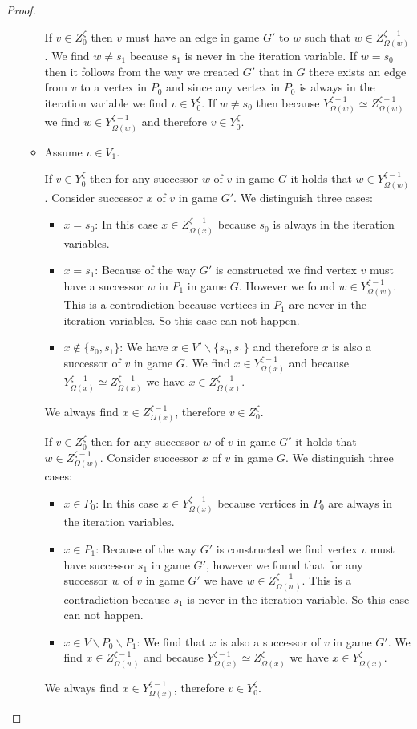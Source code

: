 \begin{theorem}
\begin{proof}
\begin{itemize}
\begin{itemize}
				If $v \in Z_0^{\zeta}$ then $v$ must have an edge in game $G'$ to $w$ such that $w\in Z^{\zeta-1}_{\Omega(w)}$. We find $w \neq s_1$ because $s_1$ is never in the iteration variable. If $w = s_0$ then it follows from the way we created $G'$ that in $G$ there exists an edge from $v$ to a vertex in $P_0$ and since any vertex in $P_0$ is always in the iteration variable we find $v \in Y_0^{\zeta}$. If $w \neq s_0$ then because $Y^{\zeta-1}_{\Omega(w)} \simeq Z^{\zeta-1}_{\Omega(w)}$ we find $w \in Y^{\zeta-1}_{\Omega(w)}$ and therefore $v \in Y_0^{\zeta}$.
				\item Assume $v \in V_1$.
				
				If $v \in Y_0^{\zeta}$ then for any successor $w$ of $v$ in game $G$ it holds that $w \in Y^{\zeta-1}_{\Omega(w)}$. Consider successor $x$ of $v$ in game $G'$. We distinguish three cases:
				\begin{itemize}
					\item $x = s_0$: In this case $x \in Z^{\zeta-1}_{\Omega(x)}$ because $s_0$ is always in the iteration variables.
					\item $x = s_1$: Because of the way $G'$ is constructed we find vertex $v$ must have a successor $w$ in $P_1$ in game $G$. However we found $w \in Y^{\zeta-1}_{\Omega(w)}$. This is a contradiction because vertices in $P_1$ are never in the iteration variables. So this case can not happen.
					\item $x \notin \{s_0,s_1\}$: We have $x \in V'\backslash \{s_0,s_1\}$ and therefore $x$ is also a successor of $v$ in game $G$. We find $x \in Y^{\zeta-1}_{\Omega(x)}$ and because $Y^{\zeta-1}_{\Omega(x)} \simeq Z^{\zeta-1}_{\Omega(x)}$ we have $x \in Z^{\zeta-1}_{\Omega(x)}$.
				\end{itemize}
				We always find  $x \in Z^{\zeta-1}_{\Omega(x)}$, therefore $v \in Z_0^{\zeta}$.
				
				If $v \in Z_0^{\zeta}$ then for any successor $w$ of $v$ in game $G'$ it holds that $w \in Z^{\zeta-1}_{\Omega(w)}$. Consider successor $x$ of $v$ in game $G$. We distinguish three cases:
				\begin{itemize}
					\item $x \in P_0$: In this case $x \in Y^{\zeta-1}_{\Omega(x)}$ because vertices in $P_0$ are always in the iteration variables.
					\item $x \in P_1$: Because of the way $G'$ is constructed we find vertex $v$ must have successor $s_1$ in game $G'$, however we found that for any successor $w$ of $v$ in game $G'$ we have $w \in Z^{\zeta-1}_{\Omega(w)}$. This is a contradiction because $s_1$ is never in the iteration variable. So this case can not happen.
					\item $x \in V \backslash P_0 \backslash P_1$: We find that $x$ is also a successor of $v$ in game $G'$. We find $x \in Z^{\zeta-1}_{\Omega(w)}$ and because $Y^{\zeta-1}_{\Omega(x)} \simeq Z^{\zeta}_{\Omega(x)}$ we have $x \in Y^{\zeta}_{\Omega(x)}$.
				\end{itemize}
				We always find  $x \in Y^{\zeta-1}_{\Omega(x)}$, therefore $v \in Y_0^{\zeta}$.
			\end{itemize}
			

\end{itemize}
\end{proof}
\end{theorem}
